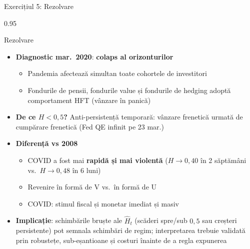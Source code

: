 \documentclass[9pt, aspectratio=169, t]{beamer}
\begin{document}
\begin{frame}[shrink=15]{Exercițiul 5: Rezolvare}
\begin{cminipage}{0.95\textwidth}
\begin{exampleblock}{Rezolvare}
\begin{itemize}\setlength{\itemsep}{0pt}
    \item \textbf{Diagnostic mar.\ 2020}: \textbf{colaps al orizonturilor}
    \begin{itemize}\setlength{\itemsep}{0pt}
        \item Pandemia afectează simultan toate cohortele de investitori
        \item Fondurile de pensii, fondurile value și fondurile de hedging adoptă comportament HFT (vânzare în panică)
    \end{itemize}
    \item \textbf{De ce $H<0{,}5$?} Anti-persistență temporară: vânzare frenetică urmată de cumpărare frenetică (Fed QE infinit pe 23 mar.)
    \item \textbf{Diferență vs 2008}
    \begin{itemize}\setlength{\itemsep}{0pt}
        \item COVID a fost mai \textbf{rapidă și mai violentă} ($H\to 0{,}40$ în 2 săptămâni vs.\ $H\to 0{,}48$ în 6 luni)
        \item Revenire în formă de V vs.\ în formă de U
        \item COVID: stimul fiscal și monetar imediat și masiv
    \end{itemize}
    \item \textbf{Implicație}: schimbările bruște ale $\hat H_t$ (scăderi spre/sub $0{,}5$ sau creșteri persistente) pot semnala schimbări de regim; interpretarea trebuie validată prin robustețe, sub-eșantioane și costuri înainte de a regla expunerea
\end{itemize}
\end{exampleblock}
\end{cminipage}
\end{frame}
\end{document}
